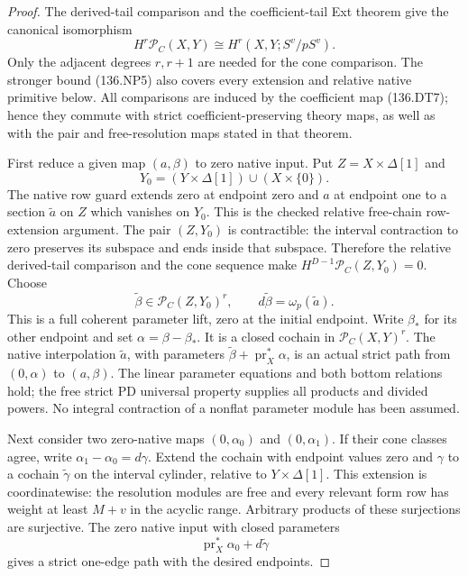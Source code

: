 \begin{proof}
The derived-tail comparison and the coefficient-tail Ext theorem
give the canonical isomorphism
\[
              H^r\mathcal P_C(X,Y)
                       \cong H^r(X,Y;S^v/pS^v).          \tag{136.NP7}
\]
Only the adjacent degrees \(r,r+1\) are needed for the cone
comparison.  The stronger bound (136.NP5) also covers every
extension and relative native primitive below.  All comparisons
are induced by the coefficient map (136.DT7); hence they commute
with strict coefficient-preserving theory maps, as well as with
the pair and free-resolution maps stated in that theorem.

First reduce a given map \((a,\beta)\) to zero native input.
Put \(Z=X\times\Delta[1]\) and
\[
        Y_0=(Y\times\Delta[1])\cup(X\times\{0\}).
\]
The native row guard extends zero at endpoint zero and \(a\)
at endpoint one to a section \(\widetilde a\) on \(Z\)
which vanishes on \(Y_0\).  This is the checked relative
free-chain row-extension argument.  The pair \((Z,Y_0)\)
is contractible: the interval contraction to zero preserves its
subspace and ends inside that subspace.  Therefore the relative
derived-tail comparison and the cone sequence make
\(H^{D-1}\mathcal P_C(Z,Y_0)=0\).  Choose
\[
        \widetilde\beta\in\mathcal P_C(Z,Y_0)^r,
                      \qquad d\widetilde\beta
                                        =\omega_p(\widetilde a).
                                                               \tag{136.NP8}
\]
This is a full coherent parameter lift, zero at the initial
endpoint.  Write \(\beta_*\) for its other endpoint and set
\(\alpha=\beta-\beta_*\).  It is a closed cochain in
\(\mathcal P_C(X,Y)^r\).  The native interpolation
\(\widetilde a\), with parameters
\(\widetilde\beta+\operatorname{pr}_X^*\alpha\), is an
actual strict path from \((0,\alpha)\) to \((a,\beta)\).
The linear parameter equations and both bottom relations hold;
the free strict PD universal property supplies all products and
divided powers.  No integral contraction of a nonflat parameter
module has been assumed.

Next consider two zero-native maps \((0,\alpha_0)\) and
\((0,\alpha_1)\).  If their cone classes agree, write
\(\alpha_1-\alpha_0=d\gamma\).  Extend the cochain
with endpoint values zero and \(\gamma\) to a cochain
\(\widetilde\gamma\) on the interval cylinder, relative
to \(Y\times\Delta[1]\).  This extension is coordinatewise:
the resolution modules are free and every relevant form row has
weight at least \(M+v\) in the acyclic range.  Arbitrary
products of these surjections are surjective.  The zero native
input with closed parameters
\[
       \operatorname{pr}_X^*\alpha_0+d\widetilde\gamma
                                                               \tag{136.NP9}
\]
gives a strict one-edge path with the desired endpoints.


\end{proof}
